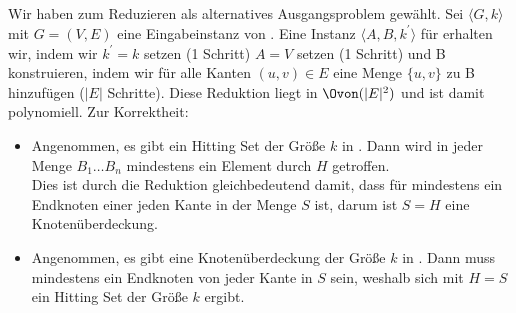 \documentclass[a4paper]{article}
\begin{document}
			\subsection{}
			Wir haben zum Reduzieren als alternatives Ausgangsproblem \vertexcover gewählt.\n
			Sei $ \langle G, k \rangle $ mit $ G = (V, E)$ eine Eingabeinstanz von \vertexcover. Eine Instanz $ \langle A,B, k^\prime \rangle $ für \hitset erhalten wir, indem wir $k^\prime = k$ setzen (1 Schritt) $A=V$ setzen (1 Schritt) und B konstruieren, indem wir für alle Kanten $(u,v) \in E$ eine Menge $\{u,v\}$ zu B hinzufügen ($|E|$ Schritte).\n
			Diese Reduktion liegt in $\Ovon(|E|^2)$ und ist damit polynomiell.\n
			Zur Korrektheit:
			\begin{itemize}
				\item Angenommen, es gibt ein Hitting Set der Größe $k$ in \hitset. Dann wird in jeder Menge $B_1 \dots B_n$ mindestens ein Element durch $H$ getroffen. \\
				Dies ist durch die Reduktion gleichbedeutend damit, dass für \vertexcover mindestens ein Endknoten einer jeden Kante in der Menge $S$ ist, darum ist $S = H$ eine Knotenüberdeckung.
				\item Angenommen, es gibt eine Knotenüberdeckung der Größe $k$ in \vertexcover. Dann muss mindestens ein Endknoten von jeder Kante in $S$ sein, weshalb sich mit $H = S$ ein Hitting Set der Größe $k$ ergibt.
			\end{itemize}
\end{document}
